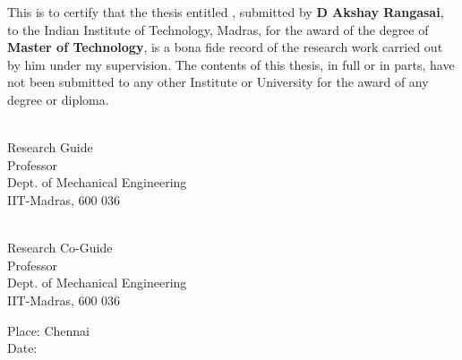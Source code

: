 \documentclass[MTech]{iitmdiss}
\def\thesistitle{}
\def\thesisauthor{D Akshay Rangasai}
\begin{document}


\title{\thesistitle}

\author{\thesisauthor}

\date{May 2015}

\begin{singlespace}
\maketitle 
\end{singlespace} 

\certificate

\vspace*{0.5in}

\noindent This is to certify that the thesis entitled {\bf {\thesistitle}}, 
submitted by {\bf {\thesisauthor}}, to the Indian Institute of Technology, 
Madras, for the award of the degree of {\bf Master of Technology}, 
is a bona fide record of the research work carried out by him under my
supervision. The contents of this thesis, in full or in parts, have not been
submitted to any other Institute or University for the award of any degree or
diploma.

\vspace*{1.4in}
\hspace*{-0.25in}
\begin{minipage}{0.5\textwidth}
\begin{singlespace}
 \\
\noindent Research Guide \\ 
\noindent Professor \\
\noindent Dept. of Mechanical Engineering\\
\noindent IIT-Madras, 600 036 \\
\end{singlespace}
\end{minipage}
\begin{minipage}{0.5\textwidth}
\begin{singlespace}
 \\
\noindent Research Co-Guide \\ 
\noindent Professor \\
\noindent Dept. of Mechanical Engineering\\
\noindent IIT-Madras, 600 036 \\
\end{singlespace}
\end{minipage}
\vspace*{0.20in}
\noindent Place: Chennai\\ 
Date:
\end{document}
